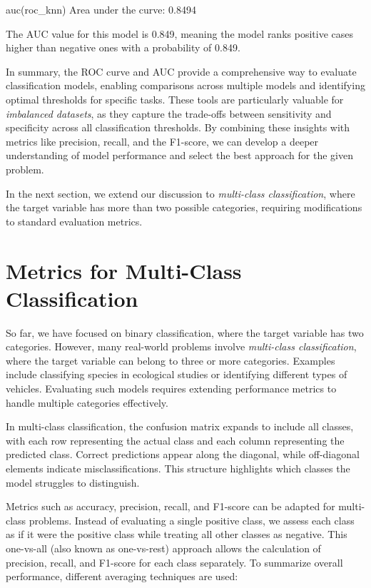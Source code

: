 \documentclass[
  11pt,
]{book}
\makeatletter
\newenvironment{Shaded}{}{}
\newcommand{\FloatTok}[1]{#1}
\newcommand{\FunctionTok}[1]{#1}
\newcommand{\NormalTok}[1]{#1}
\newcommand{\SpecialCharTok}[1]{\textcolor[rgb]{0.39,0.39,0.39}{#1}}
\newenvironment{kframe}{%
\medskip{}
\setlength{\fboxsep}{.8em}
 \def\at@end@of@kframe{}%
 \ifinner\ifhmode%
  \def\at@end@of@kframe{\end{minipage}}%
  \begin{minipage}{\columnwidth}%
 \fi\fi%
 \def\FrameCommand##1{\hskip\@totalleftmargin \hskip-\fboxsep
 \colorbox{shadecolor}{##1}\hskip-\fboxsep
     \hskip-\linewidth \hskip-\@totalleftmargin \hskip\columnwidth}%
 \MakeFramed {\advance\hsize-\width
   \@totalleftmargin\z@ \linewidth\hsize
   \@setminipage}}%
 {\par\unskip\endMakeFramed%
 \at@end@of@kframe}
\renewenvironment{Shaded}{\begin{kframe}}{\end{kframe}}
\theoremstyle{definition}
\theoremstyle{definition}
\theoremstyle{definition}
\theoremstyle{definition}
\theoremstyle{remark}
\makeatother
\begin{document}
\begin{Shaded}
\begin{Highlighting}[]
\FunctionTok{auc}\NormalTok{(roc\_knn)}
\NormalTok{   Area under the curve}\SpecialCharTok{:} \FloatTok{0.8494}
\end{Highlighting}
\end{Shaded}

The AUC value for this model is 0.849, meaning the model ranks positive cases higher than negative ones with a probability of 0.849.

In summary, the ROC curve and AUC provide a comprehensive way to evaluate classification models, enabling comparisons across multiple models and identifying optimal thresholds for specific tasks. These tools are particularly valuable for \emph{imbalanced datasets}, as they capture the trade-offs between sensitivity and specificity across all classification thresholds. By combining these insights with metrics like precision, recall, and the F1-score, we can develop a deeper understanding of model performance and select the best approach for the given problem.

In the next section, we extend our discussion to \emph{multi-class classification}, where the target variable has more than two possible categories, requiring modifications to standard evaluation metrics.

\section{Metrics for Multi-Class Classification}\label{metrics-for-multi-class-classification}

So far, we have focused on binary classification, where the target variable has two categories. However, many real-world problems involve \emph{multi-class classification}, where the target variable can belong to three or more categories. Examples include classifying species in ecological studies or identifying different types of vehicles. Evaluating such models requires extending performance metrics to handle multiple categories effectively.

In multi-class classification, the confusion matrix expands to include all classes, with each row representing the actual class and each column representing the predicted class. Correct predictions appear along the diagonal, while off-diagonal elements indicate misclassifications. This structure highlights which classes the model struggles to distinguish.

Metrics such as accuracy, precision, recall, and F1-score can be adapted for multi-class problems. Instead of evaluating a single positive class, we assess each class as if it were the positive class while treating all other classes as negative. This one-vs-all (also known as one-vs-rest) approach allows the calculation of precision, recall, and F1-score for each class separately. To summarize overall performance, different averaging techniques are used:
\end{document}
